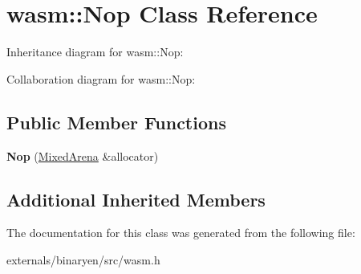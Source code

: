 \hypertarget{classwasm_1_1_nop}{}\section{wasm\+:\+:Nop Class Reference}
\label{classwasm_1_1_nop}


Inheritance diagram for wasm\+:\+:Nop\+:


Collaboration diagram for wasm\+:\+:Nop\+:
\subsection*{Public Member Functions}
\begin{DoxyCompactItemize}
\item 
\mbox{\label{classwasm_1_1_nop_a314d611601fb5498a68d5147f975b574}} 
{\bfseries Nop} (\mbox{\hyperlink{struct_mixed_arena}{Mixed\+Arena}} \&allocator)
\end{DoxyCompactItemize}
\subsection*{Additional Inherited Members}


The documentation for this class was generated from the following file\+:\begin{DoxyCompactItemize}
\item 
externals/binaryen/src/wasm.\+h\end{DoxyCompactItemize}
